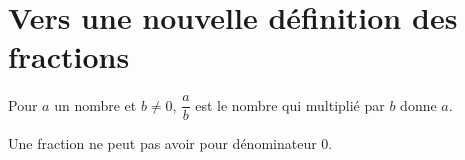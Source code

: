 \section{Vers une nouvelle définition des fractions}

{Pour $a$ un nombre et $b\neq 0$, $\dfrac{a}{b}$ est le nombre qui multiplié par $b$ donne $a$.}
%




{Une fraction ne peut pas avoir pour dénominateur 0.}


